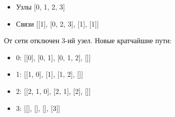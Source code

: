 \begin{itemize}
	\item Узлы [0, 1, 2, 3]
	\item Связи [[1], [0, 2, 3], [1], [1]]
\end{itemize}

От сети отключен 3-ий узел. Новые кратчайшие пути:
\begin{itemize}
	\item 0: [[0], [0, 1], [0, 1, 2], []]
	\item 1: [[1, 0], [1], [1, 2], []]
	\item 2: [[2, 1, 0], [2, 1], [2], []]
	\item 3: [[], [], [], [3]]
\end{itemize}

